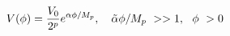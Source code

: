 \begin{equation}
V(\phi)={V_0 \over 2^p} e^{{\alpha}\phi/M_p},~~~\tilde{\alpha}\phi/M_p~>>1,~~\phi~>0
\label{exppot}
\end{equation}

